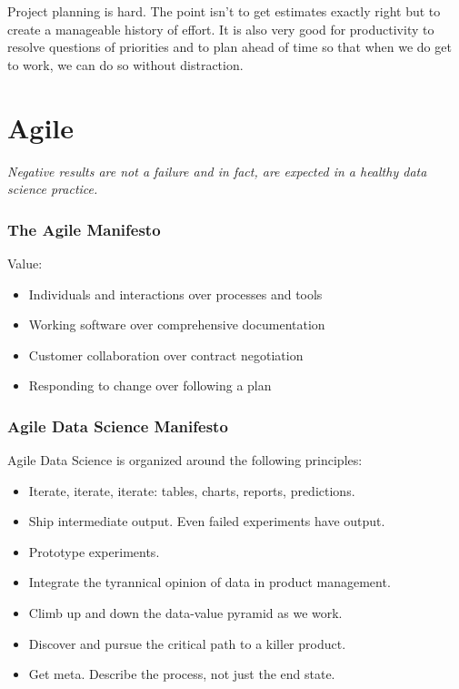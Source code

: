 \documentclass[
  11pt,
]{book}
\providecommand{\tightlist}{%
  \setlength{\itemsep}{0pt}\setlength{\parskip}{0pt}}
\begin{document}
Project planning is hard. The point isn't to get estimates exactly right but to create a manageable history of effort. It is also very good for productivity to resolve questions of priorities and to plan ahead of time so that when we do get to work, we can do so without distraction.

\hypertarget{agile}{%
\chapter{Agile}\label{agile}}

\emph{Negative results are not a failure and in fact, are expected in a healthy data science practice.}

\hypertarget{the-agile-manifesto}{%
\subsection{The Agile Manifesto}\label{the-agile-manifesto}}

Value:

\begin{itemize}
\tightlist
\item
  Individuals and interactions over processes and tools
\item
  Working software over comprehensive documentation
\item
  Customer collaboration over contract negotiation
\item
  Responding to change over following a plan
\end{itemize}

\hypertarget{agile-data-science-manifesto}{%
\subsection{Agile Data Science Manifesto}\label{agile-data-science-manifesto}}

Agile Data Science is organized around the following principles:

\begin{itemize}
\tightlist
\item
  Iterate, iterate, iterate: tables, charts, reports, predictions.
\item
  Ship intermediate output. Even failed experiments have output.
\item
  Prototype experiments.
\item
  Integrate the tyrannical opinion of data in product management.
\item
  Climb up and down the data-value pyramid as we work.
\item
  Discover and pursue the critical path to a killer product.
\item
  Get meta. Describe the process, not just the end state.
\end{itemize}
\end{document}
